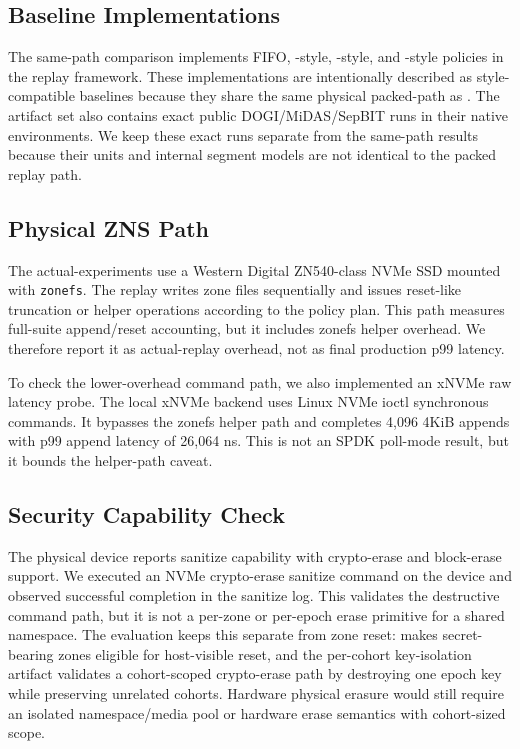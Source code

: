 \subsection{Baseline Implementations}

The same-path comparison implements FIFO, \sepbit-style, \midas-style, and \dogi-style policies in the replay framework.  These implementations are intentionally described as style-compatible baselines because they share the same physical packed-\zns path as \system.  The artifact set also contains exact public DOGI/MiDAS/SepBIT runs in their native environments.  We keep these exact runs separate from the same-path results because their units and internal segment models are not identical to the packed replay path.

\subsection{Physical ZNS Path}

The actual-\zns experiments use a Western Digital ZN540-class \zns NVMe SSD mounted with \texttt{zonefs}.  The replay writes zone files sequentially and issues reset-like truncation or helper operations according to the policy plan.  This path measures full-suite append/reset accounting, but it includes zonefs helper overhead.  We therefore report it as actual-\zns replay overhead, not as final production p99 latency.

To check the lower-overhead command path, we also implemented an xNVMe raw \zns latency probe.  The local xNVMe backend uses Linux NVMe ioctl synchronous commands.  It bypasses the zonefs helper path and completes 4,096 4KiB appends with p99 append latency of 26,064 ns.  This is not an SPDK poll-mode result, but it bounds the helper-path caveat.

\subsection{Security Capability Check}

The physical device reports sanitize capability with crypto-erase and block-erase support.  We executed an NVMe crypto-erase sanitize command on the device and observed successful completion in the sanitize log.  This validates the destructive command path, but it is not a per-zone or per-epoch erase primitive for a shared namespace.  The evaluation keeps this separate from zone reset: \system makes secret-bearing zones eligible for host-visible reset, and the per-cohort key-isolation artifact validates a cohort-scoped crypto-erase path by destroying one epoch key while preserving unrelated cohorts.  Hardware physical erasure would still require an isolated namespace/media pool or hardware erase semantics with cohort-sized scope.
